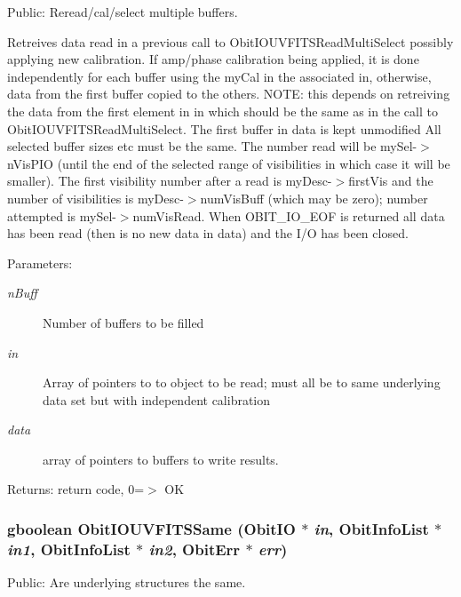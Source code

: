 Public: Reread/cal/select multiple buffers. 

Retreives data read in a previous call to Obit\-IOUVFITSRead\-Multi\-Select possibly applying new calibration. If amp/phase calibration being applied, it is done independently for each buffer using the my\-Cal in the associated in, otherwise, data from the first buffer copied to the others. NOTE: this depends on retreiving the data from the first element in in which should be the same as in the call to Obit\-IOUVFITSRead\-Multi\-Select. The first buffer in data is kept unmodified All selected buffer sizes etc must be the same. The number read will be my\-Sel-$>$n\-Vis\-PIO (until the end of the selected range of visibilities in which case it will be smaller). The first visibility number after a read is my\-Desc-$>$first\-Vis and the number of visibilities is my\-Desc-$>$num\-Vis\-Buff (which may be zero); number attempted is my\-Sel-$>$num\-Vis\-Read. When OBIT\_\-IO\_\-EOF is returned all data has been read (then is no new data in data) and the I/O has been closed. \begin{Desc}
\item[Parameters:]
\begin{description}
\item[{\em n\-Buff}]Number of buffers to be filled \item[{\em in}]Array of pointers to to object to be read; must all be to same underlying data set but with independent calibration \item[{\em data}]array of pointers to buffers to write results. \end{description}
\end{Desc}
\begin{Desc}
\item[Returns:]return code, 0=$>$ OK \end{Desc}
\subsubsection{\setlength{\rightskip}{0pt plus 5cm}gboolean Obit\-IOUVFITSSame ({\bf Obit\-IO} $\ast$ {\em in}, {\bf Obit\-Info\-List} $\ast$ {\em in1}, {\bf Obit\-Info\-List} $\ast$ {\em in2}, {\bf Obit\-Err} $\ast$ {\em err})}\label{ObitIOUVFITS_8h_a7}


Public: Are underlying structures the same. 

